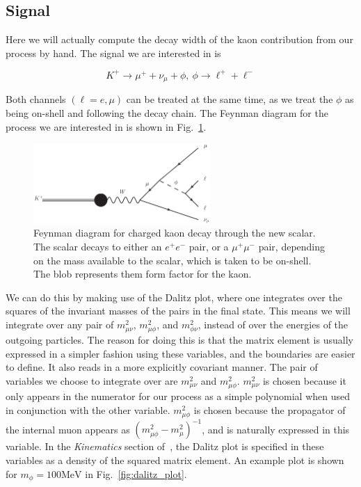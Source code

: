 \subsection{Signal}
Here we will actually compute the decay width of the kaon contribution from our process by hand.
The signal we are interested in is

\begin{equation}
    K^+ \rightarrow \mu^+ + \nu_\mu + \phi,~\phi \rightarrow \ell^+ + \ell^-
\end{equation}

\noindent Both channels $(\ell = e, \mu)$ can be treated at the same time, as we treat the $\phi$ as being on-shell and following the decay chain.
The Feynman diagram for the process we are interested in is shown in Fig.~\ref{fig:kaon_decay_signal}.

\begin{figure}[h]
    \centering
    \includegraphics[width=0.6\textwidth]{Figures/feynman_diagrams/k_munull_scalar}
    \caption{Feynman diagram for charged kaon decay through the new scalar. The scalar decays to either an $e^+ e^-$ pair, or a $\mu^+ \mu^-$ pair, depending on the mass available to the scalar, which is taken to be on-shell. The blob represents them form factor for the kaon.}
    \label{fig:kaon_decay_signal}
\end{figure}

We can do this by making use of the Dalitz plot, where one integrates over the squares of the invariant masses of the pairs in the final state.
This means we will integrate over any pair of $m_{\mu\nu}^2$, $m_{\mu\phi}^2$, and $m_{\phi\nu}^2$, instead of over the energies of the outgoing particles.
The reason for doing this is that the matrix element is usually expressed in a simpler fashion using these variables, and the boundaries are easier to define.
It also reads in a more explicitly covariant manner.
The pair of variables we choose to integrate over are $m_{\mu\nu}^2$ and $m_{\mu\phi}^2$.
$m_{\mu\nu}^2$ is chosen because it only appears in the numerator for our process as a simple polynomial when used in conjunction with the other variable.
$m_{\mu\phi}^2$ is chosen because the propagator of the internal muon appears as $\left(m_{\mu\phi}^2 - m_\mu^2\right)^{-1}$, and is naturally expressed in this variable.
In the \emph{Kinematics} section of~\cite{Agashe:2014kda}, the Dalitz plot is specified in these variables as a density of the squared matrix element.
An example plot is shown for $m_\phi = 100\textrm{MeV}$ in Fig.~\ref{fig:dalitz_plot}.

